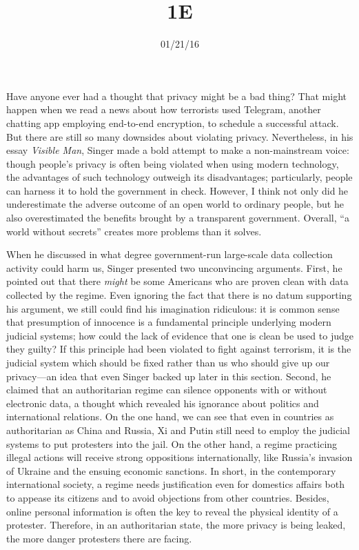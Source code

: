 \documentclass{writing}
\title{1E}
\date{01/21/16}
\begin{document}
\maketitle

Have anyone ever had a thought that privacy might be a bad thing? That
might happen when we read a news about how terrorists used Telegram,
another chatting app employing end-to-end encryption, to schedule a
successful attack. But there are still so many downsides about violating
privacy. Nevertheless, in his essay \emph{Visible Man}, Singer made a
bold attempt to make a non-mainstream voice: though people's privacy is
often being violated when using modern technology, the advantages of
such technology outweigh its disadvantages; particularly, people can
harness it to hold the government in check. However, I think not only
did he underestimate the adverse outcome of an open world to ordinary
people, but he also overestimated the benefits brought by a transparent
government. Overall, ``a world without secrets'' creates more problems
than it solves.

When he discussed in what degree government-run large-scale data
collection activity could harm us, Singer presented two unconvincing
arguments. First, he pointed out that there \emph{might} be some
Americans who are proven clean with data collected by the regime. Even
ignoring the fact that there is no datum supporting his argument, we
still could find his imagination ridiculous: it is common sense that
presumption of innocence is a fundamental principle underlying modern
judicial systems; how could the lack of evidence that one is clean be
used to judge they guilty? If this principle had been violated to fight
against terrorism, it is the judicial system which should be fixed
rather than us who should give up our privacy---an idea that even Singer
backed up later in this section. Second, he claimed that an
authoritarian regime can silence opponents with or without electronic
data, a thought which revealed his ignorance about politics and
international relations. On the one hand, we can see that even in
countries as authoritarian as China and Russia, Xi and Putin still need
to employ the judicial systems to put protesters into the jail. On the
other hand, a regime practicing illegal actions will receive strong
oppositions internationally, like Russia's invasion of Ukraine and the
ensuing economic sanctions. In short, in the contemporary international
society, a regime needs justification even for domestics affairs both to
appease its citizens and to avoid objections from other countries.
Besides, online personal information is often the key to reveal the
physical identity of a protester. Therefore, in an authoritarian state,
the more privacy is being leaked, the more danger protesters there are
facing.
\end{document}

